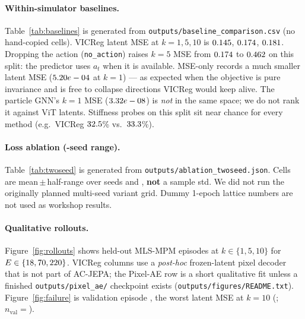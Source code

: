 \documentclass{article}
\begin{document}
\paragraph{Within-simulator baselines.}
Table~\ref{tab:baselines} is generated from
\texttt{outputs/baseline\_comparison.csv} (no hand-copied cells). VICReg latent
MSE at $k{=}1,5,10$ is $0.145$, $0.174$,
$0.181$. Dropping the action
(\texttt{no\_action}) raises $k{=}5$ MSE from $0.174$ to
$0.462$ on this split: the predictor uses $a_t$ when it is available.
MSE-only records a much smaller latent MSE ($5.20e-04$ at $k{=}1$) --- as
expected when the objective is pure invariance and is free to collapse
directions VICReg would keep alive. The particle GNN's $k{=}1$ MSE
($3.32e-08$) is \emph{not} in the same space; we do not rank it against
ViT latents. Stiffness probes on this split sit near chance for every method
(e.g.\ VICReg $32.5$\% vs.\ $33.3$\%).



\paragraph{Loss ablation (\NSeeds{}-seed range).}
Table~\ref{tab:twoseed} is generated from \texttt{outputs/ablation\_twoseed.json}.
Cells are mean\,$\pm$\,half-range over seeds \TrainSeedYaml{} and \SeedB{}, \textbf{not} a sample
std. We did not run the originally planned multi-seed variant grid. Dummy 1-epoch lattice
numbers are not used as workshop results.





\paragraph{Qualitative rollouts.}
Figure~\ref{fig:rollouts} shows held-out MLS-MPM episodes at
$k\in\{1,5,10\}$ for $E\in\{18,70,220\}$. VICReg columns
use a \emph{post-hoc} frozen-latent pixel decoder that is not part of AC-JEPA;
the Pixel-AE row is a short qualitative fit unless a finished
\texttt{outputs/pixel\_ae/} checkpoint exists
(\texttt{outputs/figures/README.txt}). Figure~\ref{fig:failure} is validation
episode \FailureEpisode{}, the worst latent MSE at $k{=}10$
(\FailureMseKten{}; $n_{\mathrm{val}}{=}$\NValPhysics{}).
\end{document}

